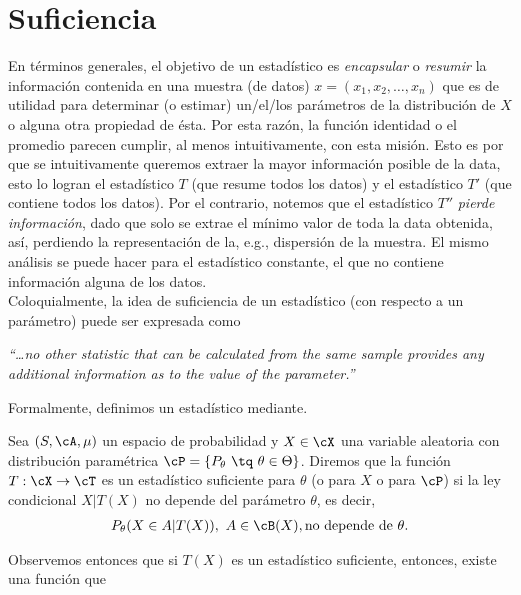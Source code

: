 \section{Suficiencia}
En términos generales, el objetivo de un estadístico es \textit{encapsular} o \textit{resumir} la información contenida en una muestra (de datos) $x = (x_1,x_2,\ldots,x_n)$ que es de utilidad para determinar (o estimar) un/el/los parámetros de la distribución de $X$ o alguna otra propiedad de ésta. Por esta razón, la función identidad o el promedio parecen cumplir, al menos intuitivamente, con esta misión. Esto es por que se intuitivamente queremos extraer la mayor información posible de la data, esto lo logran el estadístico $T$ (que resume todos los datos) y el estadístico $T'$ (que contiene todos los datos). Por el contrario, notemos que el estadístico $T''$ \emph{pierde información}, dado que solo se extrae el mínimo valor de toda la data obtenida, así, perdiendo la representación de la, e.g., dispersión de la muestra. El mismo análisis se puede hacer para el estadístico constante, el que no contiene  información alguna de los datos.\\

Coloquialmente, la idea de suficiencia de un estadístico (con respecto a un parámetro) puede ser expresada como  
\begin{displayquote} \it
“…no other statistic that can be calculated from the same sample provides any additional information as to the value of the parameter.”
\end{displayquote}

Formalmente, definimos un estadístico mediante. 
\begin{definition}
\label{def:estadístico_suficiente}
Sea $(S,\cA,\mu)$ un espacio de probabilidad y $X\in\cX$ una variable aleatoria con distribución paramétrica $\cP = \{P_\theta\ \tq\ \theta\in\Theta\}$. Diremos que la función $T:\cX\rightarrow\cT$ es un estadístico suficiente para $\theta$ (o para $X$ o para $\cP$) si la ley condicional $X|T(X)$ no depende del parámetro $\theta$, es decir, 
\begin{align}
\nonumber
	P_\theta(X\in A | T(X)),\ A\in\cB(X), \text{no depende de }\theta.
\end{align} 
\end{definition}

Observemos entonces que si $T(X)$ es un estadístico suficiente, entonces, existe una función que

